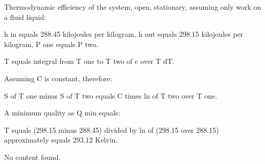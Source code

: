 Thermodynamic efficiency of the system, open, stationary, assuming only work on a fluid liquid:

h in equals 288.45 kilojoules per kilogram, h out equals 298.15 kilojoules per kilogram, P one equals P two.

T equals integral from T one to T two of c over T dT.

Assuming C is constant, therefore:

S of T one minus S of T two equals C times ln of T two over T one.

A minimum quality as Q min equals:

T equals (298.15 minus 288.45) divided by ln of (298.15 over 288.15) approximately equals 293.12 Kelvin.

No content found.